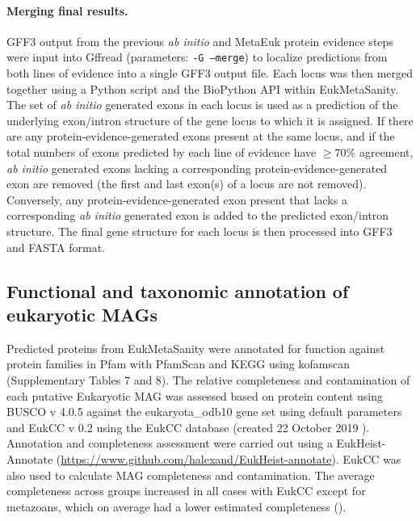\documentclass[12pt]{article}
\numberwithin{equation}{section}
\begin{document}
\paragraph{Merging final results.} GFF3 output from the previous \textit{ab initio} and MetaEuk protein evidence steps were input into Gffread \citep{Pertea2020} (parameters: \texttt{-G --merge}) to localize predictions from both lines of evidence into a single GFF3 output file.  Each locus was then merged together using a Python \citep{Python} script and the BioPython API \citep{BioPython} within EukMetaSanity. The set of \textit{ab initio} generated exons in each locus is used as a prediction of the underlying exon/intron structure of the gene locus to which it is assigned. If there are any protein-evidence-generated exons present at the same locus, and if the total numbers of exons predicted by each line of evidence have $\geq 70\%$ agreement, \textit{ab initio} generated exons lacking a corresponding protein-evidence-generated exon are removed (the first and last exon(s) of a locus are not removed). Conversely, any protein-evidence-generated exon present that lacks a corresponding \textit{ab initio} generated exon is added to the predicted exon/intron structure. The final gene structure for each locus is then processed into GFF3 and FASTA format.

\subsection*{Functional and taxonomic annotation of eukaryotic MAGs} 

Predicted proteins from EukMetaSanity were annotated for function against protein families in Pfam with PfamScan \citep{Finn2014Pfam} and KEGG using kofamscan \citep{Kanehisa_2019, Aramaki_2019} (Supplementary Tables 7 and 8). The relative completeness and contamination  of each putative Eukaryotic MAG was assessed based on protein content using BUSCO v 4.0.5 against the eukaryota\_odb10 gene set using default parameters \citep{Simao2015BUSCO} and EukCC v 0.2 using the EukCC database (created 22 October 2019 \citep{Saary2020Estimating}). Annotation and completeness assessment were carried out using a EukHeist-Annotate (\url{https://www.github.com/halexand/EukHeist-annotate}). EukCC \citep{Saary2020Estimating} was also used to calculate MAG completeness and contamination. The average completeness across groups increased in all cases with EukCC except for metazoans, which on average had a lower estimated completeness (). 
\end{document}
